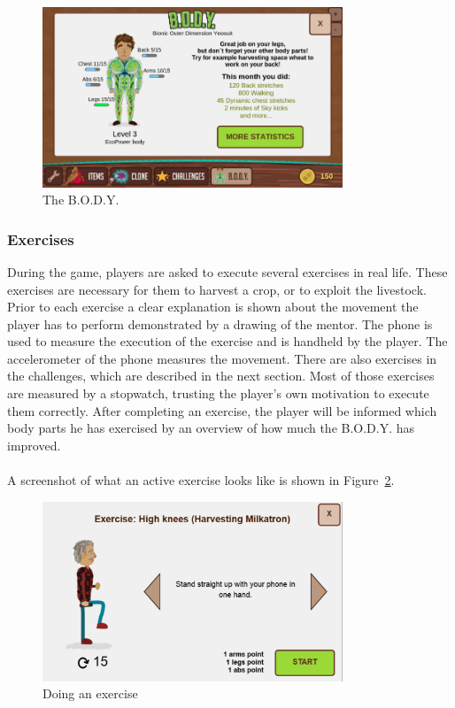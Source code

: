 \begin{figure}[h]
	\centering
		\includegraphics[width=0.80\textwidth]{images/SceneBody.png}
	\caption{The B.O.D.Y.}
	\label{fig:body}
\end{figure}

\subsubsection{Exercises}
During the game, players are asked to execute several exercises in real life. These exercises are necessary for them to harvest a crop, or to exploit the livestock. Prior to each exercise a clear explanation is shown about the movement the player has to perform demonstrated by a drawing of the mentor. The phone is used to measure the execution of the exercise and is handheld by the player. The accelerometer of the phone measures the movement. There are also exercises in the challenges, which are described in the next section. Most of those exercises are measured by a stopwatch, trusting the player's own motivation to execute them correctly. After completing an exercise, the player will be informed which body parts he has exercised by an overview of how much the B.O.D.Y. has improved.
\\\\
A screenshot of what an active exercise looks like is shown in Figure~\ref{fig:exercise}.

\begin{figure}[h]
	\centering
		\includegraphics[width=0.80\textwidth]{images/exercise.png}
	\caption{Doing an exercise}
	\label{fig:exercise}
\end{figure}

